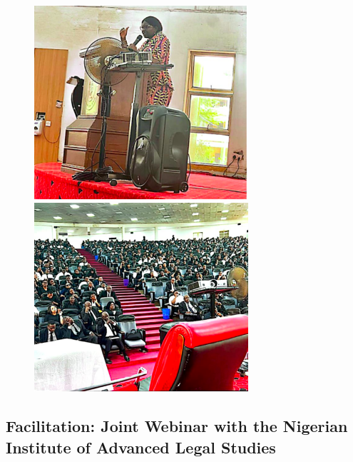 \documentclass[
  letterpaper,
  DIV=11,
  numbers=noendperiod]{scrreprt}
\begin{document}
\begin{figure}

\begin{minipage}{0.50\linewidth}
\begin{center}
\includegraphics[width=3.125in,height=\textheight,keepaspectratio]{images/return/01_0_sens.png}
\end{center}
\end{minipage}%
%
\begin{minipage}{0.50\linewidth}
\begin{center}
\includegraphics[width=3.125in,height=\textheight,keepaspectratio]{images/return/01_1_sens.png}
\end{center}
\end{minipage}%

\end{figure}%

\subsection{Facilitation: Joint Webinar with the Nigerian Institute of
Advanced Legal
Studies}\label{facilitation-joint-webinar-with-the-nigerian-institute-of-advanced-legal-studies}
\end{document}

